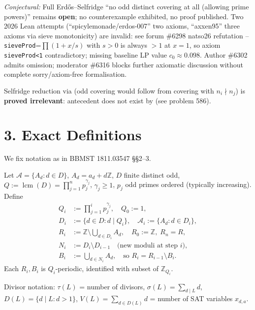 \documentclass[11pt,a4paper]{article}
\theoremstyle{plain}
\theoremstyle{definition}
\theoremstyle{remark}
\newcommand{\Z}{\mathbb{Z}}
\newcommand{\cO}{c_{0}}
\begin{document}
\textit{Conjectural:} Full Erd\H{o}s--Selfridge ``no odd distinct covering at all (allowing prime powers)'' remains \textbf{open}; no counterexample exhibited, no proof published. Two 2026 Lean attempts (``spicylemonade/erdos-007'' two axioms, ``axxen95'' three axioms via sieve monotonicity) are invalid: see forum \#6298 natso26 refutation -- \texttt{sieveProd}=$\prod(1+x/s)$ with $s>0$ is always $>1$ at $x=1$, so axiom \texttt{sieveProd<1} contradictory; missing baseline LP value $\cO\approx0.098$. Author \#6302 admits omission; moderator \#6316 blocks further axiomatic discussion without complete sorry/axiom-free formalisation.

Selfridge reduction via \cite{Sc67} (odd covering would follow from covering with $n_{i}\nmid n_{j}$) is \textbf{proved irrelevant}: antecedent does not exist by \cite{ErGr80} (see problem 586).

\section{3. Exact Definitions}

We fix notation as in BBMST 1811.03547 \S\S2--3.

Let $\mathcal A=\{A_{d}:d\in D\}$, $A_{d}=a_{d}+d\Z$, $D$ finite distinct odd, $Q:=\operatorname{lcm}(D)=\prod_{j=1}^{n}p_{j}^{\gamma_{j}}$, $\gamma_{j}\ge1$, $p_{j}$ odd primes ordered (typically increasing). Define
\begin{align*}
Q_{i}&:=\prod_{j=1}^{i}p_{j}^{\gamma_{j}},\quad Q_{0}:=1,\\
D_{i}&:=\{d\in D:d\mid Q_{i}\},\quad\mathcal A_{i}:=\{A_{d}:d\in D_{i}\},\\
R_{i}&:=\Z\setminus\bigcup_{d\in D_{i}}A_{d},\quad R_{0}:=\Z,\;R_{n}=R,\\
N_{i}&:=D_{i}\setminus D_{i-1}\quad\text{(new moduli at step $i$)},\\
B_{i}&:=\bigcup_{d\in N_{i}}A_{d},\quad\text{so }R_{i}=R_{i-1}\setminus B_{i}\tag{1811.03547 (3)}.
\end{align*}
Each $R_{i},B_{i}$ is $Q_{i}$-periodic, identified with subset of $\Z_{Q_{i}}$.

Divisor notation: $\tau(L)$ = number of divisors, $\sigma(L)=\sum_{d\mid L}d$, $D(L)=\{d\mid L:d>1\}$, $V(L)=\sum_{d\in D(L)}d$ = number of SAT variables $x_{d,a}$.

\end{document}
